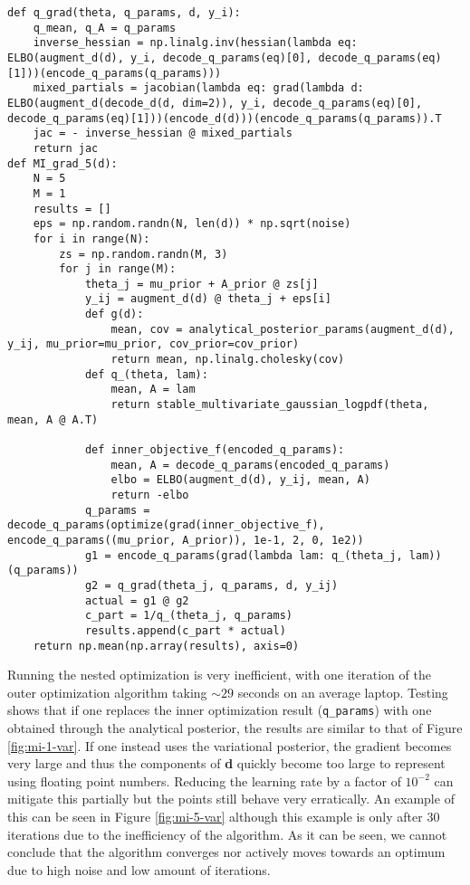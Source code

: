 \begin{verbatim}
def q_grad(theta, q_params, d, y_i):
    q_mean, q_A = q_params
    inverse_hessian = np.linalg.inv(hessian(lambda eq: ELBO(augment_d(d), y_i, decode_q_params(eq)[0], decode_q_params(eq)[1]))(encode_q_params(q_params)))
    mixed_partials = jacobian(lambda eq: grad(lambda d: ELBO(augment_d(decode_d(d, dim=2)), y_i, decode_q_params(eq)[0], decode_q_params(eq)[1]))(encode_d(d)))(encode_q_params(q_params)).T
    jac = - inverse_hessian @ mixed_partials
    return jac
def MI_grad_5(d):
    N = 5
    M = 1
    results = []
    eps = np.random.randn(N, len(d)) * np.sqrt(noise)
    for i in range(N):
        zs = np.random.randn(M, 3)
        for j in range(M):
            theta_j = mu_prior + A_prior @ zs[j]
            y_ij = augment_d(d) @ theta_j + eps[i]
            def g(d):
                mean, cov = analytical_posterior_params(augment_d(d), y_ij, mu_prior=mu_prior, cov_prior=cov_prior)
                return mean, np.linalg.cholesky(cov)
            def q_(theta, lam):
                mean, A = lam
                return stable_multivariate_gaussian_logpdf(theta, mean, A @ A.T)
            
            def inner_objective_f(encoded_q_params):
                mean, A = decode_q_params(encoded_q_params)
                elbo = ELBO(augment_d(d), y_ij, mean, A)
                return -elbo
            q_params = decode_q_params(optimize(grad(inner_objective_f), encode_q_params((mu_prior, A_prior)), 1e-1, 2, 0, 1e2))
            g1 = encode_q_params(grad(lambda lam: q_(theta_j, lam))(q_params))
            g2 = q_grad(theta_j, q_params, d, y_ij)
            actual = g1 @ g2
            c_part = 1/q_(theta_j, q_params)
            results.append(c_part * actual)
    return np.mean(np.array(results), axis=0)
\end{verbatim}
Running the nested optimization is very inefficient, with one iteration of the outer optimization algorithm taking $\sim 29$ seconds on an average laptop.
Testing shows that if one replaces the inner optimization result (\texttt{q\_params}) with one obtained through the analytical posterior, the results are similar to that of Figure \ref{fig:mi-1-var}.
If one instead uses the variational posterior, the gradient becomes very large and thus the components of \textbf{d} quickly become too large to represent using floating point numbers. 
Reducing the learning rate by a factor of $10^{-2}$ can mitigate this partially
but the points still behave very erratically. An example of this can be seen in Figure \ref{fig:mi-5-var} although this example is only after 30 iterations due to the inefficiency of the algorithm.
As it can be seen, we cannot conclude that the algorithm converges nor actively moves towards an optimum due to high noise and low amount of iterations.

